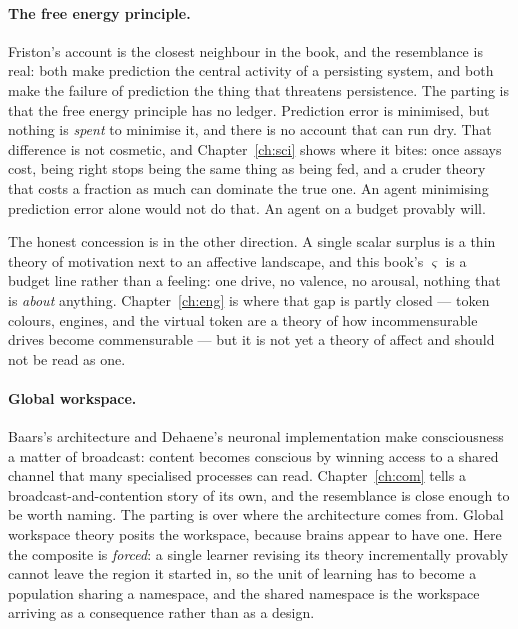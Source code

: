 \paragraph{The free energy principle.}
Friston's account \cite{friston2010free} is the closest neighbour
in the book, and the resemblance is real: both make prediction the
central activity of a persisting system, and both make the failure
of prediction the thing that threatens persistence.
The parting is that the free energy principle has no ledger.
Prediction error is minimised, but nothing is \emph{spent} to
minimise it, and there is no account that can run dry.
That difference is not cosmetic, and Chapter~\ref{ch:sci} shows
where it bites: once assays cost, being right stops being the same
thing as being fed, and a cruder theory that costs a fraction as
much can dominate the true one.
An agent minimising prediction error alone would not do that.
An agent on a budget provably will.

The honest concession is in the other direction.
A single scalar surplus is a thin theory of motivation next to an
affective landscape, and this book's $\varsigma$ is a budget line
rather than a feeling: one drive, no valence, no arousal, nothing
that is \emph{about} anything.
Chapter~\ref{ch:eng} is where that gap is partly closed --- token
colours, engines, and the virtual token are a theory of how
incommensurable drives become commensurable --- but it is not yet
a theory of affect and should not be read as one.

\paragraph{Global workspace.}
Baars's architecture \cite{baars1988} and Dehaene's neuronal
implementation \cite{dehaene2011} make consciousness a matter of
broadcast: content becomes conscious by winning access to a shared
channel that many specialised processes can read.
Chapter~\ref{ch:com} tells a broadcast-and-contention story of its
own, and the resemblance is close enough to be worth naming.
The parting is over where the architecture comes from.
Global workspace theory posits the workspace, because brains appear
to have one.
Here the composite is \emph{forced}: a single learner revising its
theory incrementally provably cannot leave the region it started
in, so the unit of learning has to become a population sharing a
namespace, and the shared namespace is the workspace arriving as a
consequence rather than as a design.

